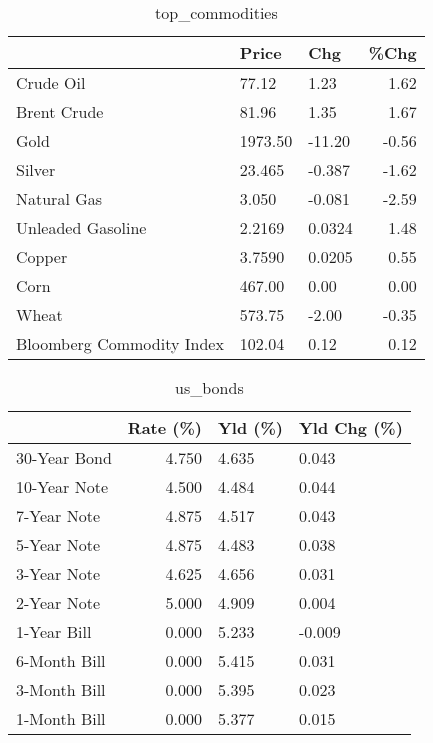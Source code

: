 \documentclass{article}%
\begin{document}
\begin{table}[htbp]%
\caption{top\_commodities}%
\centering%
\begin{adjustbox}{width=1\textwidth}%
\begin{tabular}{lllr}
\toprule
                          &   Price &    Chg &  \%Chg \\
\midrule
               Crude Oil  &   77.12 &   1.23 &  1.62 \\
             Brent Crude  &   81.96 &   1.35 &  1.67 \\
                    Gold  & 1973.50 & -11.20 & -0.56 \\
                  Silver  &  23.465 & -0.387 & -1.62 \\
             Natural Gas  &   3.050 & -0.081 & -2.59 \\
       Unleaded Gasoline  &  2.2169 & 0.0324 &  1.48 \\
                  Copper  &  3.7590 & 0.0205 &  0.55 \\
                    Corn  &  467.00 &   0.00 &  0.00 \\
                   Wheat  &  573.75 &  -2.00 & -0.35 \\
Bloomberg Commodity Index &  102.04 &   0.12 &  0.12 \\
\bottomrule
\end{tabular}
%
\end{adjustbox}%
\end{table}

%


\begin{table}[htbp]%
\caption{us\_bonds}%
\centering%
\begin{adjustbox}{width=1\textwidth}%
\begin{tabular}{lrll}
\toprule
             &  Rate (\%) & Yld (\%) & Yld Chg (\%) \\
\midrule
30-Year Bond &     4.750 &   4.635 &       0.043 \\
10-Year Note &     4.500 &   4.484 &       0.044 \\
 7-Year Note &     4.875 &   4.517 &       0.043 \\
 5-Year Note &     4.875 &   4.483 &       0.038 \\
 3-Year Note &     4.625 &   4.656 &       0.031 \\
 2-Year Note &     5.000 &   4.909 &       0.004 \\
 1-Year Bill &     0.000 &   5.233 &      -0.009 \\
6-Month Bill &     0.000 &   5.415 &       0.031 \\
3-Month Bill &     0.000 &   5.395 &       0.023 \\
1-Month Bill &     0.000 &   5.377 &       0.015 \\
\bottomrule
\end{tabular}
%
\end{adjustbox}%
\end{table}
\end{document}
